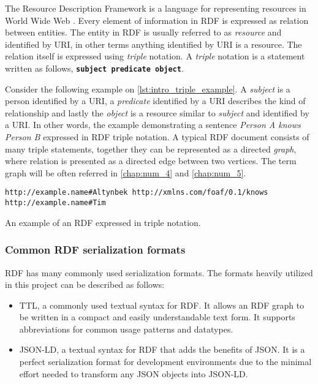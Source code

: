 The Resource Description Framework is a language for representing resources in World Wide Web \cite{rdf}\cite{rdf_primer}. Every element of information in RDF is expressed as relation between entities. The entity in RDF is usually referred to as \textit{resource} and identified by \gls{URI}, in other terms anything identified by URI is a resource. The relation itself is expressed using \textit{triple} notation. A \textit{triple} notation is a statement written as follows, \texttt{\textbf{subject} \textbf{predicate} \textbf{object}}.

Consider the following example on \autoref{lst:intro_triple_example}. A \textit{subject} is a person identified by a URI, a \textit{predicate} identified by a URI describes the kind of relationship and lastly the \textit{object} is a resource similar to \textit{subject} and identified by a URI. In other words, the example demonstrating a sentence \textit{Person A knows Person B} expressed in RDF triple notation. A typical RDF document consists of many triple statements, together they can be represented as a directed \textit{graph}, where relation is presented as a directed edge between two vertices. The term graph will be often referred in \autoref{chap:num_4}  and \autoref{chap:num_5}.
 
\begin{listing}[ht]    
\begin{verbatim}
http://example.name#Altynbek http://xmlns.com/foaf/0.1/knows http://example.name#Tim
\end{verbatim}
\caption{An example of an RDF expressed in triple notation.} 
\label{lst:intro_triple_example}
\end{listing}

\subsubsection{Common RDF serialization formats}

RDF has many commonly used serialization formats. The formats heavily utilized in this project can be described as follows:
\begin{itemize}
	\item \gls{TTL}, a commonly used textual syntax for RDF. It allows an RDF graph to be written in a compact and easily understandable text form. It supports abbreviations for common usage patterns and datatypes.
	\item \gls{JSON-LD}, a textual syntax for RDF that adds the benefits of JSON. It is a perfect serialization format for development environments due to the minimal effort needed to transform any JSON objects into JSON-LD. 
\end{itemize}

